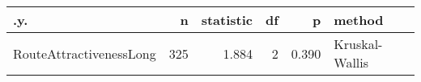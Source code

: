 \begin{tabular}{lrrrrl}
  \hline
.y. & n & statistic & df & p & method \\ 
  \hline
RouteAttractivenessLong &  325 & 1.884 &    2 & 0.390 & Kruskal-Wallis \\ 
   \hline
\end{tabular}
